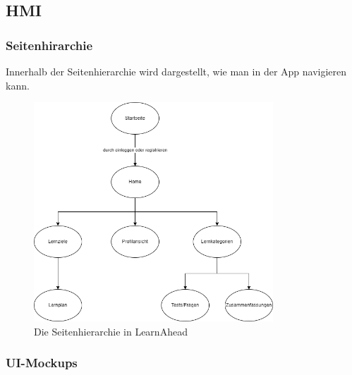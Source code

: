\subsection{HMI}

\subsubsection{Seitenhirarchie}
Innerhalb der Seitenhierarchie wird dargestellt, wie man in der App navigieren kann.
\begin{figure}[H]
    \centering
    \includegraphics[width=0.8\textwidth]{images/diagramme/Seitenhierarchie.png}
    \caption{Die Seitenhierarchie in LearnAhead}
    \label{fig:UseCaseDiagramm}
\end{figure}

\newpage
\subsubsection{UI-Mockups}


